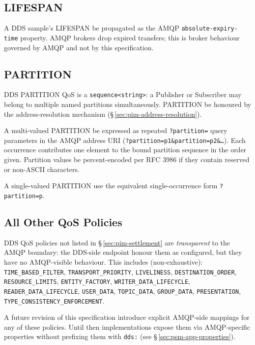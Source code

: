 \documentclass{../styles/zerodds-vendor-spec}
\begin{document}
\subsection{LIFESPAN}

A DDS sample's LIFESPAN  be propagated as the AMQP
\texttt{absolute-expiry-time} property. AMQP brokers
 drop expired transfers; this is broker behaviour
governed by AMQP and not by this specification.

\subsection{PARTITION}

DDS PARTITION QoS is a \texttt{sequence<string>}: a Publisher or
Subscriber may belong to multiple named partitions
simultaneously. PARTITION  be honoured by the
address-resolution mechanism
(\S\,\ref{sec:pim-address-resolution}).

A multi-valued PARTITION  be expressed as repeated
\texttt{?partition=} query parameters in the AMQP address URI
(\texttt{?partition=p1\&partition=p2\&\ldots}). Each occurrence
contributes one element to the bound partition sequence in the
order given. Partition values  be percent-encoded
per RFC 3986 if they contain reserved or non-ASCII characters.

A single-valued PARTITION  use the equivalent
single-occurrence form \texttt{?partition=p}.

\subsection{All Other QoS Policies}

DDS QoS policies not listed in \S\,\ref{sec:pim-settlement} are
\emph{transparent} to the AMQP boundary: the DDS-side endpoint
 honour them as configured, but they have no
AMQP-visible behaviour. This includes (non-exhaustive):
\texttt{TIME\_BASED\_FILTER}, \texttt{TRANSPORT\_PRIORITY},
\texttt{LIVELINESS}, \texttt{DESTINATION\_ORDER},
\texttt{RESOURCE\_LIMITS}, \texttt{ENTITY\_FACTORY},
\texttt{WRITER\_DATA\_LIFECYCLE}, \texttt{READER\_DATA\_LIFECYCLE},
\texttt{USER\_DATA}, \texttt{TOPIC\_DATA}, \texttt{GROUP\_DATA},
\texttt{PRESENTATION}, \texttt{TYPE\_CONSISTENCY\_ENFORCEMENT}.

A future revision of this specification  introduce
explicit AMQP-side mappings for any of these policies. Until then
implementations  expose them via AMQP-specific
properties without prefixing them with \texttt{dds:} (see
\S\,\ref{sec:psm-app-properties}).
\end{document}
